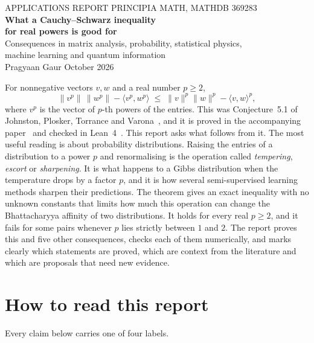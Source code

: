 \documentclass[11pt]{article}
\theoremstyle{remark}
\newcommand{\ip}[2]{\langle #1,#2\rangle}
\begin{document}
\begin{center}
{\sffamily\small\color{navy} APPLICATIONS REPORT \quad\textbullet\quad PRINCIPIA MATH, MATHDB 369283}\\[10pt]
{\sffamily\LARGE\bfseries\color{navy} What a Cauchy--Schwarz inequality\\[2pt] for real powers is good for}\\[8pt]
{\large Consequences in matrix analysis, probability, statistical physics,\\ machine learning and quantum information}\\[12pt]
Pragyaan Gaur \quad\textbullet{} October 2026
\end{center}

\begin{keybox}[title=Summary]
For nonnegative vectors $v,w$ and a real number $p\ge2$,
\[
\|v^p\|\,\|w^p\|-\ip{v^p}{w^p}\;\le\;\|v\|^p\|w\|^p-\ip vw^p,
\]
where $v^p$ is the vector of $p$-th powers of the entries. This was Conjecture~5.1 of Johnston, Plosker, Torrance and Varona~\cite{JPTV}, and it is proved in the accompanying paper~\cite{Paper} and checked in Lean~4~\cite{Repo}. This report asks what follows from it. The most useful reading is about probability distributions. Raising the entries of a distribution to a power $p$ and renormalising is the operation called \emph{tempering}, \emph{escort} or \emph{sharpening}. It is what happens to a Gibbs distribution when the temperature drops by a factor $p$, and it is how several semi-supervised learning methods sharpen their predictions. The theorem gives an exact inequality with no unknown constants that limits how much this operation can change the Bhattacharyya affinity of two distributions. It holds for every real $p\ge2$, and it fails for some pairs whenever $p$ lies strictly between $1$ and $2$. The report proves this and five other consequences, checks each of them numerically, and marks clearly which statements are proved, which are context from the literature and which are proposals that need new evidence.
\end{keybox}

\section{How to read this report}

Every claim below carries one of four labels.
\end{document}
